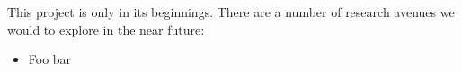 
This project is only in its beginnings. There are a number of research
avenues we would to explore in the near future:

\begin{itemize}
\item Foo bar
\end{itemize}
